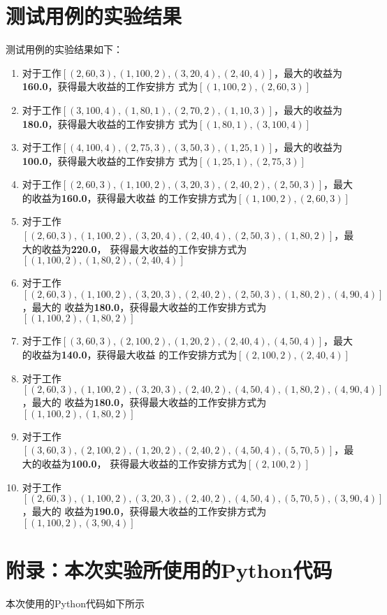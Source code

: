 \documentclass{article}
\begin{document}
\section{测试用例的实验结果}
测试用例的实验结果如下：
\begin{enumerate}
	\item 对于工作$[(2, 60, 3), (1, 100, 2), (3, 20, 4), (2, 40, 4)]$，最大的收益为\textbf{160.0}，获得最大收益的工作安排方
	式为$[(1, 100, 2), (2, 60, 3)]$
	
	 \item 对于工作$[(3, 100, 4), (1, 80, 1), (2, 70, 2), (1, 10, 3)]$，最大的收益为\textbf{180.0}，获得最大收益的工作安排方
	式为$[(1, 80, 1), (3, 100, 4)]$
	
	 \item 对于工作$[(4, 100, 4), (2, 75, 3), (3, 50, 3), (1, 25, 1)]$，最大的收益为\textbf{100.0}，获得最大收益的工作安排方
	式为$[(1, 25, 1), (2, 75, 3)]$
	
	 \item 对于工作$[(2, 60, 3), (1, 100, 2), (3, 20, 3), (2, 40, 2), (2, 50, 3)]$，最大的收益为\textbf{160.0}，获得最大收益
	的工作安排方式为$[(1, 100, 2), (2, 60, 3)]$
	
	 \item 对于工作$[(2, 60, 3), (1, 100, 2), (3, 20, 4), (2, 40, 4), (2, 50, 3), (1, 80, 2)]$，最大的收益为\textbf{220.0}，
	获得最大收益的工作安排方式为$[(1, 100, 2), (1, 80, 2), (2, 40, 4)]$
	
	 \item 对于工作$[(2, 60, 3), (1, 100, 2), (3, 20, 3), (2, 40, 2), (2, 50, 3), (1, 80, 2), (4, 90, 4)]$，最大的 
	收益为\textbf{180.0}，获得最大收益的工作安排方式为$[(1, 100, 2), (1, 80, 2)]$
	
	 \item 对于工作$[(3, 60, 3), (2, 100, 2), (1, 20, 2), (2, 40, 4), (4, 50, 4)]$，最大的收益为\textbf{140.0}，获得最大收益
	的工作安排方式为$[(2, 100, 2), (2, 40, 4)]$
	
	 \item 对于工作$[(2, 60, 3), (1, 100, 2), (3, 20, 3), (2, 40, 2), (4, 50, 4), (1, 80, 2), (4, 90, 4)]$，最大的 
	收益为\textbf{180.0}，获得最大收益的工作安排方式为$[(1, 100, 2), (1, 80, 2)]$
	
	 \item 对于工作$[(3, 60, 3), (2, 100, 2), (1, 20, 2), (2, 40, 2), (4, 50, 4), (5, 70, 5)]$，最大的收益为\textbf{100.0}，
	获得最大收益的工作安排方式为$[(2, 100, 2)]$
	
	 \item 对于工作$[(2, 60, 3), (1, 100, 2), (3, 20, 3), (2, 40, 2), (4, 50, 4), (5, 70, 5), (3, 90, 4)]$，最大的 
	收益为\textbf{190.0}，获得最大收益的工作安排方式为$[(1, 100, 2), (3, 90, 4)]$
   \end{enumerate}


\section{附录：本次实验所使用的Python代码}
本次使用的Python代码如下所示
 
\end{document}
